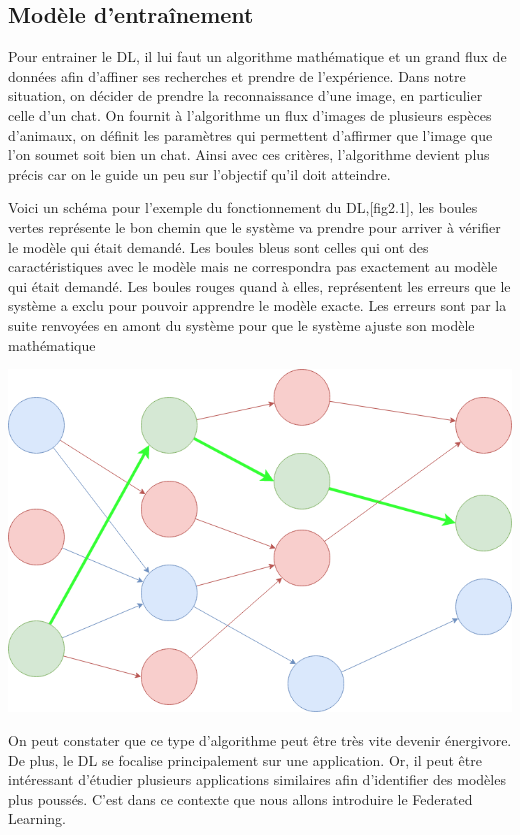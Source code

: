 \documentclass[12pt,a4paper]{report}
\begin{document}
\pagebreak

\subsection{Modèle d'entraînement}

Pour entrainer le DL, il lui faut un algorithme mathématique et un grand flux de données afin d'affiner ses recherches et prendre de l'expérience. Dans notre situation, on décider de prendre la reconnaissance d'une image, en particulier celle d'un chat.
On fournit à l'algorithme un flux d'images de plusieurs espèces d'animaux, on définit les paramètres qui permettent d'affirmer que l'image que l'on soumet soit bien un chat. Ainsi avec ces critères, l'algorithme devient plus précis car on le guide un peu sur l'objectif qu'il doit atteindre.
 
Voici un schéma pour l'exemple du fonctionnement du DL,[fig2.1], les boules vertes représente le bon chemin que le système va prendre pour arriver à vérifier le modèle qui était demandé. Les boules bleus sont celles qui ont des caractéristiques avec le modèle mais ne correspondra pas exactement au modèle qui était demandé. Les boules rouges quand à elles, représentent les erreurs que le système a exclu pour pouvoir apprendre le modèle exacte. Les erreurs sont par la suite renvoyées en amont du système pour que le système ajuste son modèle mathématique

\begin{center}
	\includegraphics[scale=0.4]{deep_learning_schema}
	\label{fig1}
\end{center}

On peut constater que ce type d'algorithme peut être très vite devenir énergivore. De plus, le DL se focalise principalement sur une application. Or, il peut être intéressant d'étudier plusieurs applications similaires afin d'identifier des modèles plus poussés. C'est dans ce contexte que nous allons introduire le Federated Learning.
\end{document}
